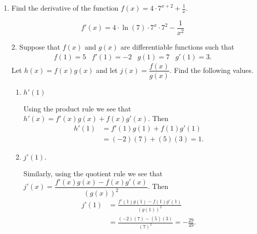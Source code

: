 \documentclass[11pt]{article}
\begin{document}
\pagestyle{empty}
\newsavebox{\quizfront}
\begin{lrbox}{\quizfront}
\begin{minipage}[top][4.5in][t]{\textwidth} \setlength{\parindent}{1.5em}
\drawtitle
\vspace{-0.5in}
\begin{enumerate}

\item Find the derivative of the function $\displaystyle f(x)=4\cdot
  7^{x+2}+\frac{1}{x}$.

  \vfill
  {\color{blue}
    \[
    f'(x) = 4\cdot\ln(7)\cdot 7^{x}\cdot7^2 - \frac{1}{x^2}
    \]
  }
  \vfill

\end{enumerate}


\end{minipage}
\end{lrbox}

\newsavebox{\quizback}
\begin{lrbox}{\quizback}
\begin{minipage}[top][4.5in][t]{\textwidth} \setlength{\parindent}{1.5em}
\begin{enumerate}
\item[2.] Suppose that $f(x)$ and $g(x)$ are differentiable functions
  such that
  \[
  \begin{array}{cccc}
    f(1) = 5 & f'(1) = -2 & g(1) = 7 & g'(1) = 3.
  \end{array}
  \]  
  Let $h(x) = f(x) g(x)$ and let $j(x) = \dfrac{f(x)}{g(x)}$. Find the
  following values.
  \begin{enumerate}
  \item $h'(1)$
    \vfill
    {\color{blue}

      Using the product rule we see that \(h'(x) = f'(x)g(x) +
      f(x)g'(x)\). Then 
      \begin{align*}
        h'(1) &= f'(1)g(1) + f(1)g'(1)\\
        &= (-2)(7) + (5)(3) = 1.
      \end{align*}
      
    }
    \vfill
  \item $j'(1)$.
    \vfill
    {\color{blue}

      Similarly, using the quotient rule we see that \(j'(x) =
      \dfrac{f'(x)g(x) - f(x)g'(x)}{(g(x))^2}\). Then 
      \begin{align*}
        j'(1) &= \frac{f'(1)g(1) - f(1)g'(1)}{(g(1))^2} \\
        &= \frac{(-2)(7)-(5)(3)}{(7)^2} = -\frac{29}{49}.
      \end{align*}
      
    }
    \vfill
  \end{enumerate}

\end{enumerate}
\end{minipage}
\end{lrbox}
\end{document}

